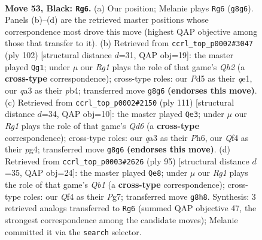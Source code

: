 \documentclass[11pt]{article}
\begin{document}
\clearpage

\begin{figure}[p]\centering
\begin{subfigure}{0.46\textwidth}\centering
\resizebox{\linewidth}{!}{%
\newchessgame
\chessboard[
  setfen={6r1/8/5p2/3p1k2/5q2/Q5P1/P5KP/8 b - - 1 53},
  showmover=false,
  pgfstyle=straightmove, color=movearrow, markmove={g8-g6}
]}
\caption{}
\end{subfigure}\hfill
\begin{subfigure}{0.46\textwidth}\centering
\resizebox{\linewidth}{!}{%
\newchessgame
\chessboard[
  setfen={R7/6pk/7p/8/1p6/8/1P4PQ/4q2K w - - 3 52},
  showmover=false,
  pgfstyle=straightmove, color=movearrow, markmove={h2-g1}
]}
\caption{}
\end{subfigure}
\\[4pt]
\begin{subfigure}{0.46\textwidth}\centering
\resizebox{\linewidth}{!}{%
\newchessgame
\chessboard[
  setfen={8/6p1/7p/p6P/3k2P1/3q1P1K/5Q2/8 b - - 10 56},
  showmover=false,
  pgfstyle=straightmove, color=movearrow, markmove={d3-e3}
]}
\caption{}
\end{subfigure}\hfill
\begin{subfigure}{0.46\textwidth}\centering
\resizebox{\linewidth}{!}{%
\newchessgame
\chessboard[
  setfen={1q5k/6p1/7p/7P/8/5QP1/5P1K/8 b - - 10 48},
  showmover=false,
  pgfstyle=straightmove, color=movearrow, markmove={b8-e8}
]}
\caption{}
\end{subfigure}
\caption{\textbf{Move 53, Black: \texttt{Rg6}.} (a) Our position; Melanie plays \texttt{Rg6} (\texttt{g8g6}). Panels (b)--(d) are the retrieved master positions whose correspondence most drove this move (highest QAP objective among those that transfer to it). (b) Retrieved from \texttt{ccrl\_top\_p0002\#3047} (ply 102) [structural distance $d$=31, QAP obj=19]: the master played \texttt{Qg1}; under $\mu$ our \emph{Rg1} plays the role of that game's \emph{Qh2} (a \textbf{cross-type} correspondence); cross-type roles: our \emph{P}d5 as their \emph{q}e1, our \emph{q}a3 as their \emph{p}b4; transferred move \texttt{g8g6} \textbf{(endorses this move)}. (c) Retrieved from \texttt{ccrl\_top\_p0002\#2150} (ply 111) [structural distance $d$=34, QAP obj=10]: the master played \texttt{Qe3}; under $\mu$ our \emph{Rg1} plays the role of that game's \emph{Qd6} (a \textbf{cross-type} correspondence); cross-type roles: our \emph{q}a3 as their \emph{P}h6, our \emph{Q}f4 as their \emph{p}g4; transferred move \texttt{g8g6} \textbf{(endorses this move)}. (d) Retrieved from \texttt{ccrl\_top\_p0003\#2626} (ply 95) [structural distance $d$=35, QAP obj=24]: the master played \texttt{Qe8}; under $\mu$ our \emph{Rg1} plays the role of that game's \emph{Qb1} (a \textbf{cross-type} correspondence); cross-type roles: our \emph{Q}f4 as their \emph{P}g7; transferred move \texttt{g8h8}. Synthesis: 3 retrieved analogs transferred to \texttt{Rg6} (summed QAP objective 47, the strongest correspondence among the candidate moves); Melanie committed it via the \texttt{search} selector.}
\label{fig:thought-m105}
\end{figure}
\end{document}
